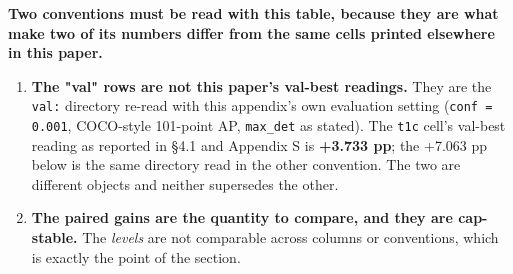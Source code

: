 \documentclass[pdflatex,sn-mathphys-ay]{sn-jnl}
\begin{document}
\textbf{Two conventions must be read with this table, because they are what make two of its numbers differ from the same cells printed elsewhere in this paper.}

\begin{enumerate}
\item \textbf{The "val" rows are not this paper's val-best readings.} They are the \texttt{val:} directory re-read with this appendix's own evaluation setting (\texttt{conf = 0.001}, COCO-style 101-point AP, \texttt{max\_det} as stated). The \texttt{t1c} cell's val-best reading as reported in \S{}4.1 and Appendix S is \textbf{+3.733 pp}; the +7.063 pp below is the same directory read in the other convention. The two are different objects and neither supersedes the other.
\item \textbf{The paired gains are the quantity to compare, and they are cap-stable.} The \emph{levels} are not comparable across columns or conventions, which is exactly the point of the section.
\end{enumerate}
\end{document}
